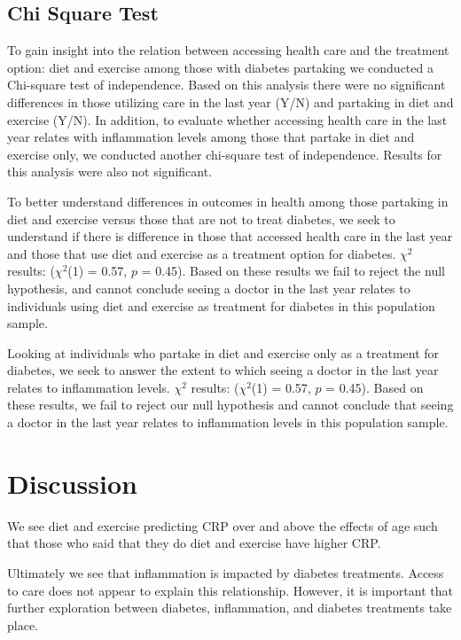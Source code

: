 \documentclass[
  man]{apa6}
\begin{document}
\hypertarget{chi-square-test}{%
\subsection{Chi Square Test}\label{chi-square-test}}

To gain insight into the relation between accessing health care and the treatment option: diet and exercise among those with diabetes partaking we conducted a Chi-square test of independence. Based on this analysis there were no significant differences in those utilizing care in the last year (Y/N) and partaking in diet and exercise (Y/N). In addition, to evaluate whether accessing health care in the last year relates with inflammation levels among those that partake in diet and exercise only, we conducted another chi-square test of independence. Results for this analysis were also not significant.

To better understand differences in outcomes in health among those partaking in diet and exercise versus those that are not to treat diabetes, we seek to understand if there is difference in those that accessed health care in the last year and those that use diet and exercise as a treatment option for diabetes. \(\chi^2\) results: (\(\chi^2\)(1) = 0.57, \(p\) = 0.45). Based on these results we fail to reject the null hypothesis, and cannot conclude seeing a doctor in the last year relates to individuals using diet and exercise as treatment for diabetes in this population sample.

Looking at individuals who partake in diet and exercise only as a treatment for diabetes, we seek to answer the extent to which seeing a doctor in the last year relates to inflammation levels. \(\chi^2\) results: (\(\chi^2\)(1) = 0.57, \(p\) = 0.45). Based on these results, we fail to reject our null hypothesis and cannot conclude that seeing a doctor in the last year relates to inflammation levels in this population sample.

\hypertarget{discussion}{%
\section{Discussion}\label{discussion}}

We see diet and exercise predicting CRP over and above the effects of age such that those who said that they do diet and exercise have higher CRP.

Ultimately we see that inflammation is impacted by diabetes treatments. Access to care does not appear to explain this relationship. However, it is important that further exploration between diabetes, inflammation, and diabetes treatments take place.
\end{document}
